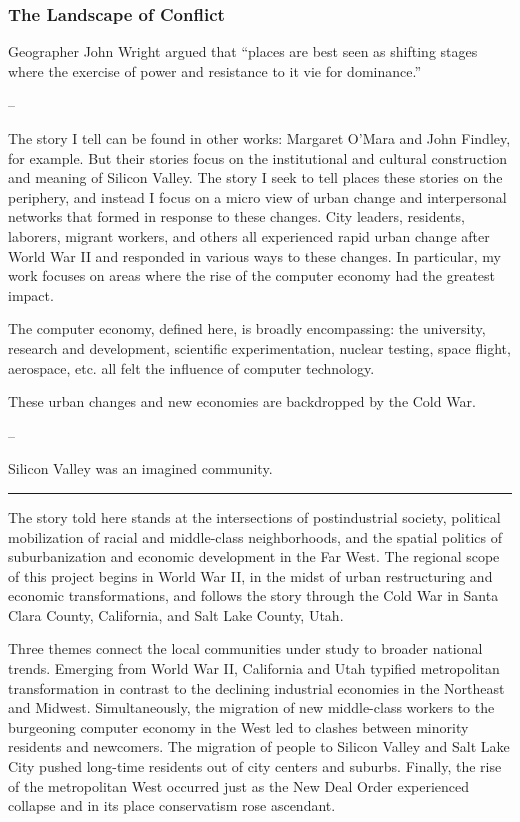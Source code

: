 \documentclass[11pt,article,oneside]{memoir}
\begin{document}
\subsubsection{The Landscape of Conflict}

Geographer John Wright argued that ``places are best seen as shifting
stages where the exercise of power and resistance to it vie for
dominance.''

--

The story I tell can be found in other works: Margaret O'Mara and John
Findley, for example. But their stories focus on the institutional and
cultural construction and meaning of Silicon Valley. The story I seek to
tell places these stories on the periphery, and instead I focus on a
micro view of urban change and interpersonal networks that formed in
response to these changes. City leaders, residents, laborers, migrant
workers, and others all experienced rapid urban change after World War
II and responded in various ways to these changes. In particular, my
work focuses on areas where the rise of the computer economy had the
greatest impact.

The computer economy, defined here, is broadly encompassing: the
university, research and development, scientific experimentation,
nuclear testing, space flight, aerospace, etc. all felt the influence of
computer technology.

These urban changes and new economies are backdropped by the Cold War.

--

Silicon Valley was an imagined community.

\begin{center}\rule{3in}{0.4pt}\end{center}

The story told here stands at the intersections of postindustrial
society, political mobilization of racial and middle-class
neighborhoods, and the spatial politics of suburbanization and economic
development in the Far West. The regional scope of this project begins
in World War II, in the midst of urban restructuring and economic
transformations, and follows the story through the Cold War in Santa
Clara County, California, and Salt Lake County, Utah.

Three themes connect the local communities under study to broader
national trends. Emerging from World War II, California and Utah
typified metropolitan transformation in contrast to the declining
industrial economies in the Northeast and Midwest. Simultaneously, the
migration of new middle-class workers to the burgeoning computer economy
in the West led to clashes between minority residents and newcomers. The
migration of people to Silicon Valley and Salt Lake City pushed
long-time residents out of city centers and suburbs. Finally, the rise
of the metropolitan West occurred just as the New Deal Order experienced
collapse and in its place conservatism rose ascendant.
\end{document}
